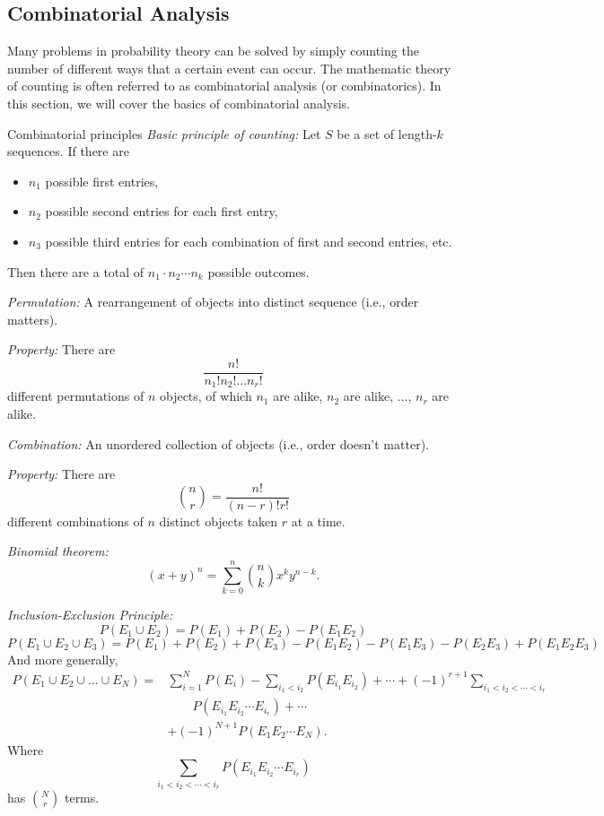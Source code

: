 \subsection{Combinatorial Analysis}

Many problems in probability theory can be solved by simply counting the number of
different ways that a certain event can occur. The mathematic theory of counting is
often referred to as combinatorial analysis (or combinatorics). In this section, we will
cover the basics of combinatorial analysis.

\begin{concept}{Combinatorial principles}
\noindent\emph{Basic principle of counting:} Let $S$ be a set of length-$k$ sequences.
If there are

\begin{itemize}
\item $n_1$ possible first entries,
\item $n_2$ possible second entries for each first entry,
\item $n_3$ possible third entries for each combination of first and second entries, etc.
\end{itemize}

Then there are a total of $n_1\cdot n_2\cdots n_k$ possible outcomes.

\noindent\emph{Permutation:} A rearrangement of objects into distinct sequence
(i.e., order matters).

\noindent\emph{Property:} There are
\[
\frac{n!}{n_1!n_2!\ldots n_r!}
\]
different permutations of $n$ objects, of which $n_1$ are alike, $n_2$ are alike,
$\ldots$, $n_r$ are alike.

\noindent\emph{Combination:} An unordered collection of objects (i.e., order
doesn't matter).

\noindent\emph{Property:} There are
\[
\binom{n}{r}=\frac{n!}{(n-r)!r!}
\]
different combinations of $n$ distinct objects taken $r$ at a time.

\noindent\emph{Binomial theorem:}
\[
(x+y)^n=\sum_{k=0}^{n}\binom{n}{k}x^k y^{n-k}.
\]

\noindent\emph{Inclusion-Exclusion Principle:}
\[
P(E_1\cup E_2)=P(E_1)+P(E_2)-P(E_1E_2)
\]
\[
P(E_1\cup E_2\cup E_3)
=P(E_1)+P(E_2)+P(E_3)-P(E_1E_2)-P(E_1E_3)-P(E_2E_3)+P(E_1E_2E_3)
\]
And more generally,
\[
\begin{aligned}
P(E_1\cup E_2\cup\ldots\cup E_N)
={}&\sum_{i=1}^{N}P(E_i)
-\sum_{i_1<i_2}P(E_{i_1}E_{i_2})
+\cdots+(-1)^{r+1}\sum_{i_1<i_2<\cdots<i_r}\\
&\qquad P(E_{i_1}E_{i_2}\cdots E_{i_r})+\cdots\\
&+(-1)^{N+1}P(E_1E_2\cdots E_N).
\end{aligned}
\]
Where
\[
\sum_{i_1<i_2<\cdots<i_r}P(E_{i_1}E_{i_2}\cdots E_{i_r})
\]
has $\binom{N}{r}$ terms.
\end{concept}

